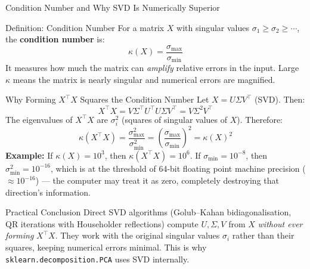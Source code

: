 \documentclass{beamer}
\begin{document}
\begin{frame}[shrink=10]{Condition Number and Why SVD Is Numerically Superior}
  \begin{block}{Definition: Condition Number}
    For a matrix $X$ with singular values $\sigma_1 \geq \sigma_2 \geq \cdots$,
    the \textbf{condition number} is:
    \[
      \kappa(X) = \frac{\sigma_{\max}}{\sigma_{\min}}
    \]
    It measures how much the matrix can \emph{amplify} relative errors
    in the input.
    Large $\kappa$ means the matrix is nearly singular and numerical
    errors are magnified.
  \end{block}

  \begin{block}{Why Forming $X^\top X$ Squares the Condition Number}
    Let $X = U\Sigma V^\top$ (SVD). Then:
    \[
      X^\top X = V\Sigma^\top U^\top U\Sigma V^\top = V\Sigma^2 V^\top
    \]
    The eigenvalues of $X^\top X$ are $\sigma_i^2$ (squares of singular
    values of $X$). Therefore:
    \[
      \kappa(X^\top X)
        = \frac{\sigma_{\max}^2}{\sigma_{\min}^2}
        = \left(\frac{\sigma_{\max}}{\sigma_{\min}}\right)^2
        = \kappa(X)^2
    \]
    \textbf{Example:} If $\kappa(X) = 10^3$, then
    $\kappa(X^\top X) = 10^6$.
    If $\sigma_{\min} = 10^{-8}$, then $\sigma_{\min}^2 = 10^{-16}$,
    which is at the threshold of 64-bit floating point machine precision
    ($\approx 10^{-16}$) --- the computer may treat it as zero,
    completely destroying that direction's information.
  \end{block}

  \begin{alertblock}{Practical Conclusion}
    Direct SVD algorithms (Golub--Kahan bidiagonalisation, QR iterations
    with Householder reflections) compute $U, \Sigma, V$ from $X$
    \emph{without ever forming} $X^\top X$.
    They work with the original singular values $\sigma_i$ rather than
    their squares, keeping numerical errors minimal.
    This is why \texttt{sklearn.decomposition.PCA} uses SVD internally.
  \end{alertblock}
\end{frame}
\end{document}
